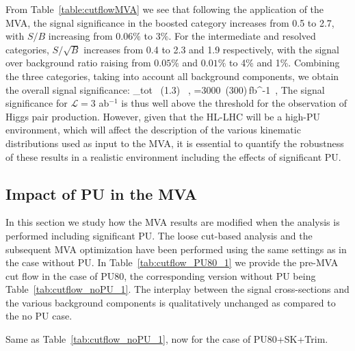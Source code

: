 From Table~\ref{table:cutflowMVA} we see that
following the application of the MVA, 
the signal significance in the boosted category increases
from 0.5 to 2.7, with $S/B$ increasing from $0.06\%$ to $3\%$.
%
For the intermediate and resolved categories, $S/\sqrt{B}$
increases from 0.4 to 2.3 and 1.9 respectively, with
the signal over background ratio raising from
$0.05\%$ and $0.01\%$ to 4\% and 1\%.
%
Combining the three categories, taking into
account all background components, we obtain the overall signal
significance:
\be
\lp {}\rp_{\rm tot} ~(1.3) \, ,\quad
{}=3000~(300)\,{\rm fb}^{-1}\, ,
\ee
%
The signal significance for
$\mathcal{L}=3$ ab$^{-1}$
is thus
well above the threshold for the observation of Higgs
pair production.
%
However, given that the HL-LHC will be a high-PU environment,
which will affect the description of the various
kinematic distributions used as input to the MVA,
it is essential to quantify the robustness of these
results
in a realistic environment including the effects of
significant PU.

\subsection{Impact of PU in the MVA}

In this section we study how the MVA results are modified
when the analysis is performed including significant PU.
%
The loose cut-based analysis and the subsequent
MVA optimization have been performed using the same
settings as in the case without PU.
%
In Table~\ref{tab:cutflow_PU80_1}
we provide the pre-MVA cut flow in the case of PU80,
the corresponding version without PU being
Table~\ref{tab:cutflow_noPU_1}.
%
The interplay between the signal cross-sections and the various
background components is qualitatively unchanged as compared
to the no PU case.

\begin{table}[t]
  \centering
  \scriptsize
      
    \caption{\small Same as Table~\ref{tab:cutflow_noPU_1},
now for the case
    of PU80+SK+Trim.
 \label{tab:cutflow_PU80_1}}
\end{table}

